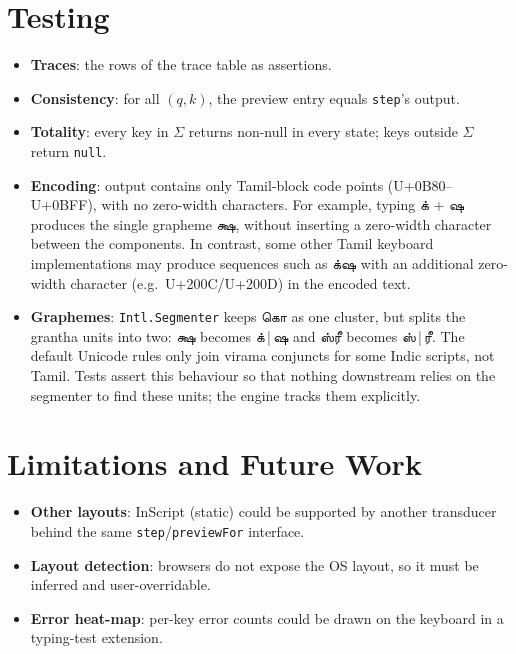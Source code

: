 \documentclass[11pt,a4paper]{article}
\newcommand{\tam}[1]{{\tamilfont #1}}
\begin{document}
\section{Testing}
\begin{itemize}
  \item \textbf{Traces}: the rows of the trace table as assertions.
  \item \textbf{Consistency}: for all $(q,k)$, the preview entry equals
        \texttt{step}'s output.
  \item \textbf{Totality}: every key in $\Sigma$ returns non-null in every
        state; keys outside $\Sigma$ return \texttt{null}.
  \item \textbf{Encoding}: output contains only Tamil-block code points 
        (U+0B80--U+0BFF), with no zero-width characters. For example, 
        typing \tam{க்} + \tam{ஷ} produces the single grapheme 
        \tam{க்ஷ}, without inserting a zero-width character between the 
        components. In contrast, some other Tamil keyboard implementations 
        may produce sequences such as \tam{க்‌ஷ} with an additional 
        zero-width character (e.g.\ U+200C/U+200D) in the encoded text.
  \item \textbf{Graphemes}: \texttt{Intl.Segmenter} keeps \tam{கொ} as one
        cluster, but splits the grantha units into two: \tam{க்ஷ} becomes
        \tam{க்}\,|\,\tam{ஷ} and \tam{ஸ்ரீ} becomes \tam{ஸ்}\,|\,\tam{ரீ}. The
        default Unicode rules only join virama conjuncts for some Indic scripts,
        not Tamil. Tests assert this behaviour so that nothing downstream
        relies on the segmenter to find these units; the engine tracks them
        explicitly.
\end{itemize}

\section{Limitations and Future Work}
\begin{itemize}
  \item \textbf{Other layouts}: InScript (static) could be
        supported by another transducer behind the same
        \texttt{step}/\texttt{previewFor} interface.
  \item \textbf{Layout detection}: browsers do not expose the OS layout, so it
        must be inferred and user-overridable.
  \item \textbf{Error heat-map}: per-key error counts could be drawn on the
        keyboard in a typing-test extension.
\end{itemize}
\end{document}
